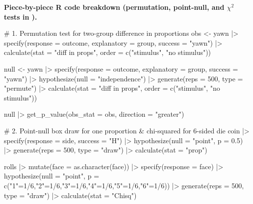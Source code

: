 \documentclass[10pt]{scrartcl}
\begin{document}
\medskip\noindent\textbf{Piece-by-piece R code breakdown (permutation, point-null, and $\chi^2$ tests in ).}

\begin{rcode}
# 1. Permutation test for two-group difference in proportions
obs <- yawn |>
  specify(response = outcome, explanatory = group, success = "yawn") |>
  calculate(stat = "diff in props", order = c("stimulus", "no stimulus"))

null <- yawn |>
  specify(response = outcome, explanatory = group, success = "yawn") |>
  hypothesize(null = "independence") |>
  generate(reps = 500, type = "permute") |>
  calculate(stat = "diff in props", order = c("stimulus", "no stimulus"))

null |> get_p_value(obs_stat = obs, direction = "greater")

# 2. Point-null box draw for one proportion & chi-squared for 6-sided die
coin |> specify(response = side, success = "H") |>
  hypothesize(null = "point", p = 0.5) |>
  generate(reps = 500, type = "draw") |>
  calculate(stat = "prop")

rolls |> mutate(face = as.character(face)) |>
  specify(response = face) |>
  hypothesize(null = "point", p = c("1"=1/6,"2"=1/6,"3"=1/6,"4"=1/6,"5"=1/6,"6"=1/6)) |>
  generate(reps = 500, type = "draw") |>
  calculate(stat = "Chisq")
\end{rcode}
\end{document}
